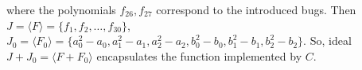 \begin{Example}
{%
where the polynomials $f_{26}, f_{27}$ correspond to the introduced
bugs. Then $J = \langle F \rangle = \{f_1,f_2,\dots,f_{30}\}$, 
$J_0 = \langle F_0\rangle =\{a_0^2-a_0,a_1^2-a_1,a_2^2-a_2,b_0^2-b_0,b_1^2-b_1,b_2^2-b_2\}$. 
So, ideal $J+J_0=\langle F + F_0\rangle$ encapsulates the function implemented by $C$. 

}
\end{Example}
